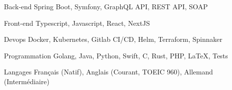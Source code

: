 

\begin{cvskills}

\cvskill
  {Back-end} %
  {Spring Boot, Symfony, GraphQL API, REST API, SOAP} %

  \cvskill
    {Front-end} %
    {Typescript, Javascript, React, NextJS} %

  \cvskill
    {Devops} %
    {Docker, Kubernetes, Gitlab CI/CD, Helm, Terraform, Spinnaker} %

  \cvskill
    {Programmation} %
    {Golang, Java, Python, Swift, C, Rust, PHP, LaTeX, Tests} %

  \cvskill
    {Langages} %
    {Français (Natif), Anglais (Courant, TOEIC 960), Allemand (Intermédiaire)} %

\end{cvskills}

